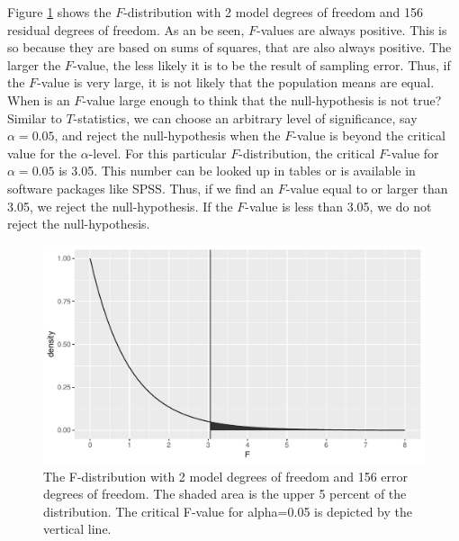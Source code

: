 \documentclass[]{report}\usepackage[]{graphicx}\usepackage[]{color}
\makeatletter
\def\maxwidth{ %
  \ifdim\Gin@nat@width>\linewidth
    \linewidth
  \else
    \Gin@nat@width
  \fi
}
\newenvironment{knitrout}{}{} %
\makeatother
\begin{document}
Figure \ref{fig:dummy_22} shows the $F$-distribution with 2 model degrees of freedom and 156 residual degrees of freedom. As an be seen, $F$-values are always positive. This is so because they are based on sums of squares, that are also always positive. The larger the $F$-value, the less likely it is to be the result of sampling error. Thus, if the $F$-value is very large, it is not likely that the population means are equal. When is an $F$-value large enough to think that the null-hypothesis is not true? Similar to $T$-statistics, we can choose an arbitrary level of significance, say $\alpha=0.05$, and reject the null-hypothesis when the $F$-value is beyond the critical value for the $\alpha$-level. For this particular $F$-distribution, the critical $F$-value for $\alpha=0.05$ is 3.05. This number can be looked up in tables or is available in software packages like SPSS. Thus, if we find an $F$-value equal to or larger than 3.05, we reject the null-hypothesis. If the $F$-value is less than 3.05, we do not reject the null-hypothesis. 


\begin{knitrout}
\color{fgcolor}\begin{figure}

{\centering \includegraphics[width=\maxwidth]{figure/dummy_22-1} 

}

\caption[The F-distribution with 2 model degrees of freedom and 156 error degrees of freedom]{The F-distribution with 2 model degrees of freedom and 156 error degrees of freedom. The shaded area is the upper 5 percent of the distribution. The critical F-value for alpha=0.05 is depicted by the vertical line.}\label{fig:dummy_22}
\end{figure}


\end{knitrout}
\end{document}
